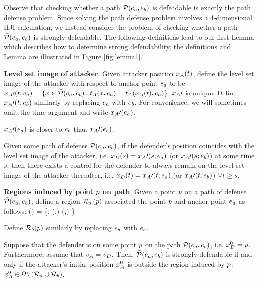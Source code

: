 Observe that checking whether a path $\bar{\mathcal{P}}(e_a,e_b)$ is defendable is exactly the path defense problem. Since solving the path defense problem involves a 4-dimensional HJI calculation, we instead consider the problem of checking whether a path $\bar{\mathcal{P}}(e_a,e_b)$ is strongly defendable. The following definitions lead to our first Lemma which describes how to determine strong defendability; the definitions and Lemma are illustrated in Figure \ref{fig:lemma1}.

\begin{defn} %
\textbf{Level set image of attacker}. Given attacker position $x_A(t)$, define the level set image of the attacker with respect to anchor point $e_a$ to be $x_A\prime(t;e_a) = \{x\in\bar{\mathcal{P}}(e_a,e_b): t_A(x,e_a) = t_A(x_A(t),e_a)\}$. $x_A\prime$ is unique. Define $x_A\prime(t;e_b)$ similarly by replacing $e_a$ with $e_b$. For convenience, we will sometimes omit the time argument and write $x_A\prime(e_a)$.
\end{defn}

\begin{rem}
\label{rem:image_of_a}
$x_A\prime(e_a)$ is closer to $e_b$ than $x_A\prime(e_b)$.
\end{rem}

\begin{rem}
Given some path of defense $\bar{\mathcal{P}}(e_a,e_b)$, if the defender's position coincides with the level set image of the attacker, i.e. $x_D(s) = x_A\prime(s;e_a)$ (or $x_A\prime(s;e_b)$) at some time $s$, then there exists a control for the defender to always remain on the level set image of the attacker thereafter, i.e. $x_D(t) = x_A\prime(t;e_a)$ (or $x_A\prime(t;e_b)$) $\forall t\ge s$.
\end{rem}

\begin{defn} %
\label{def:d_win_region}
\textbf{Regions induced by point $p$ on path}. Given a point $p$ on a path of defense $\bar{\mathcal{P}}(e_a,e_b)$, define a region $\mathcal{R}_a\left(p\right)$ associated the point $p$ and anchor point $e_a$ as follows:
\bq
\rpa\left(\ppath\right) = \left\{\x: \dist(\x,\apa) \leq \dist(\ppath,\apa) \right\}
\eq

Define $\mathcal{R}_b(p)$ similarly by replacing $e_a$ with $e_b$.
\end{defn}

\begin{lem}
\label{lem:d_winning_region}
Suppose that the defender is on some point $p$ on the path $\bar{\mathcal{P}}(e_a,e_b)$, i.e. $x_D^0 = p$. Furthermore, assume that $v_A=v_D$. Then, $\bar{\mathcal{P}}(e_a,e_b)$ is strongly defendable if and only if the attacker's initial position $x_A^0$ is outside the region induced by $p$: $x_A^0\in\Omega\backslash\left(\mathcal{R}_a \cup \mathcal{R}_b\right)$.
\end{lem}

